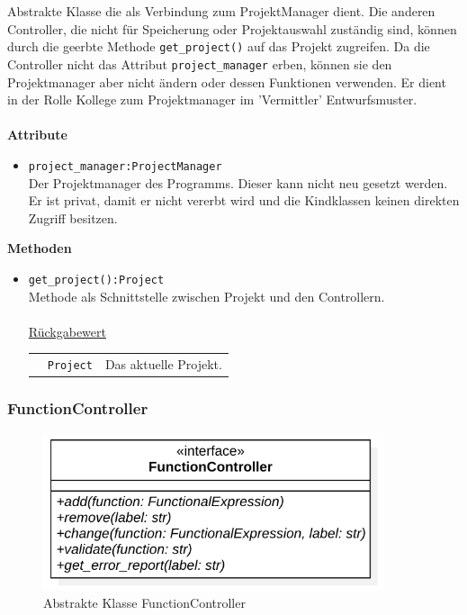 \documentclass{article}
\begin{document}
Abstrakte Klasse die als Verbindung zum ProjektManager dient. Die anderen Controller, die nicht für Speicherung oder Projektauswahl zuständig sind, können durch die geerbte Methode \texttt{get\_project()} auf das Projekt zugreifen. Da die Controller nicht das Attribut \texttt{project\_manager} erben, können sie den Projektmanager aber nicht ändern oder dessen Funktionen verwenden. Er dient in der Rolle Kollege zum 
Projektmanager im 'Vermittler' Entwurfsmuster.
\\\\
\textbf{\large{Attribute}}
\begin{itemize}
\item \texttt{project\_manager:ProjectManager}\\ Der Projektmanager des Programms. Dieser kann nicht neu gesetzt werden. Er ist privat, damit er nicht vererbt wird und die Kindklassen keinen direkten Zugriff besitzen.
\end{itemize}\leavevmode\newline
\textbf{\large{Methoden}}
\begin{itemize}
\item \texttt{get\_project():Project}\\ Methode als Schnittstelle zwischen Projekt und den Controllern.\\\\
\underline{{Rückgabewert}}\\
\begin{tabular}{lll}
 & \texttt{Project} & Das aktuelle Projekt. \\
\end{tabular}
\end{itemize}



\newpage
\subsubsection*{\large{\textbf{FunctionController}\label{cls:FunctionController}}}\normalsize

\begin{figure}[H]%
    \centering
    \includegraphics[width=10cm]{entwurf/Floriane/FunctionController.png}
    \caption{Abstrakte Klasse FunctionController}
\end{figure}
\end{document}
